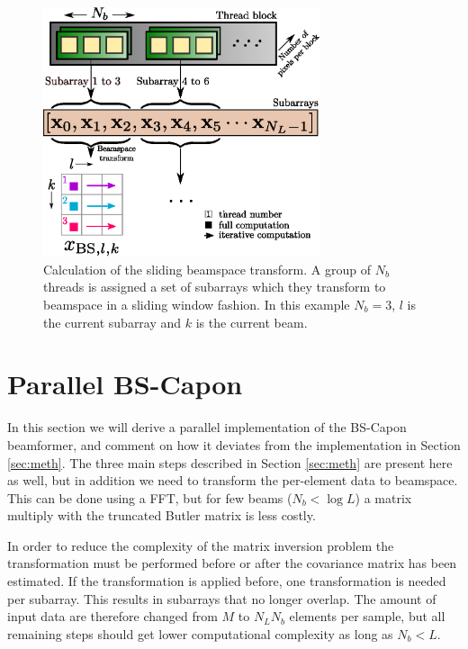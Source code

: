 \documentclass[journal]{IEEEtran}
\begin{document}
\begin{figure}
\centerline{\includegraphics[width=3.2in]{gfx/gpu_layout_bs_2.eps}}
\caption{Calculation of the sliding beamspace transform. A group of $N_b$ threads is assigned a set of subarrays which they transform to beamspace in a sliding window fashion. In this example $N_b=3$, $l$ is the current subarray and $k$ is the current beam.}
\label{fig:gpulayoutbs}
\end{figure}

\section{Parallel BS-Capon}\label{sec:bs}
In this section we will derive a parallel implementation of the BS-Capon beamformer, and comment on how it deviates from the implementation in Section \ref{sec:meth}. The three main steps described in Section \ref{sec:meth} are present here as well, but in addition we need to transform the per-element data to beamspace. This can be done using a FFT, but for few beams ($N_b < \log{L}$) a matrix multiply with the truncated Butler matrix is less costly. 

In order to reduce the complexity of the matrix inversion problem the transformation must be performed before or after the covariance matrix has been estimated. If the transformation is applied before, one transformation is needed per subarray. This results in subarrays that no longer overlap. The amount of input data are therefore changed from $M$ to $N_LN_b$ elements per sample, but all remaining steps should get lower computational complexity as long as $N_b < L$.
\end{document}
